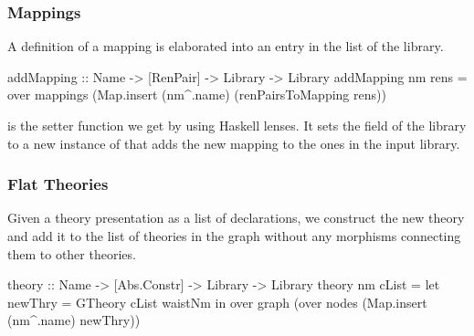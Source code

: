 \subsubsection{Mappings}
A definition of a mapping is elaborated into an entry in the  list of the library. 
\begin{hscode}
addMapping :: Name -> [RenPair] -> Library -> Library
addMapping nm rens = 
   over mappings (Map.insert (nm^.name) (renPairsToMapping rens))
\end{hscode}
\noindent {} is the setter function we get by using Haskell lenses. It sets the  field of the library to a new instance of  that adds the new mapping to the ones in the input library. 

\subsubsection{Flat Theories}
Given a theory presentation as a list of declarations, we construct the new theory and add it to the list of theories in the graph without any morphisms connecting them to other theories. 
\begin{hscode}
theory :: Name -> [Abs.Constr] -> Library -> Library
theory nm cList =
  let newThry  = GTheory cList waistNm
  in  over graph (over nodes (Map.insert (nm^.name) newThry))
\end{hscode}


